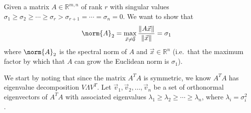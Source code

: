 

Given a matrix $A \in \mathbb{R}^{m,n}$ of rank $r$ with singular values $\sigma_{1} \geq \sigma_{2} \geq \cdots \geq \sigma_{r} > \sigma_{r+1} = \cdots = \sigma_{n} = 0$. 
We want to show that 
\begin{equation}
\norm{A}_{2} = \max_{\vec{x} \neq \vec{0}} \frac{\|A\vec{x}\|}{\|\vec{x}\|} = \sigma_{1}
\end{equation} where $\norm{A}_{2}$ is the spectral norm of $A$ and $\vec{x} \in \mathbb{R}^{n}$ (i.e.~that the maximum factor by which that $A$ can grow the Euclidean norm is $\sigma_1$). 

We start by noting that since the matrix $A^{T}A$ is symmetric, we know $A^{T}A$ has eigenvalue decomposition $V \Lambda V^{T}.$ Let $\vec{v}_{1}, \vec{v}_{2}, \ldots, \vec{v}_{n}$ be a set of orthonormal eigenvectors of $A^{T}A$ with associated eigenvalues $\lambda_{1} \geq \lambda_{2} \geq \cdots \geq \lambda_{n}$, where $\lambda_i = \sigma_i^2$.


